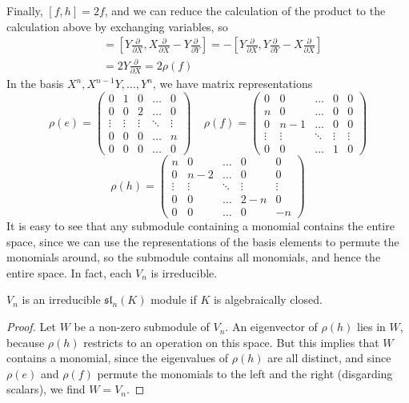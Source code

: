 %
Finally, $[f, h] = 2f$, and we can reduce the calculation of the product to the calculation above by exchanging variables, so
%
\begin{align*}
    [\rho(f), \rho(h)] &= \left[ Y \frac{\partial}{\partial X}, X \frac{\partial}{\partial X} - Y \frac{\partial}{\partial Y} \right] = - \left[ Y \frac{\partial}{\partial X}, Y \frac{\partial}{\partial Y} - X \frac{\partial}{\partial X} \right]\\
    &= 2 Y \frac{\partial}{\partial X} = 2 \rho(f)
\end{align*}
%
In the basis $X^n,X^{n-1}Y, \dots, Y^n$, we have matrix representations
%
\[ \rho(e) = \begin{pmatrix} 0 & 1 & 0 & \dots & 0 \\ 0 & 0 & 2 & \dots & 0 \\ \vdots & \vdots & \vdots & \ddots & \vdots \\ 0 & 0 & 0 & \dots & n \\ 0 & 0 & 0 & \dots & 0 \end{pmatrix}\ \ \ \ \ \rho(f) = \begin{pmatrix} 0 & 0 & \dots & 0 & 0 \\ n & 0 & \dots & 0 & 0 \\ 0 & n-1 & \dots & 0 & 0 \\ \vdots & \vdots & \ddots & \vdots & \vdots \\ 0 & 0 & \dots & 1 & 0 \end{pmatrix} \]
\[ \rho(h) = \begin{pmatrix} n & 0 & \dots & 0 & 0 \\ 0 & n-2 & \dots & 0 & 0 \\ \vdots & \vdots & \ddots & \vdots & \vdots \\ 0 & 0 & \dots & 2 - n & 0 \\ 0 & 0 & \dots & 0 & -n \end{pmatrix} \]
%
It is easy to see that any submodule containing a monomial contains the entire space, since we can use the representations of the basis elements to permute the monomials around, so the submodule contains all monomials, and hence the entire space. In fact, each $V_n$ is irreducible.

\begin{theorem}
    $V_n$ is an irreducible $\mathfrak{sl}_n(K)$ module if $K$ is algebraically closed.
\end{theorem}
\begin{proof}
    Let $W$ be a non-zero submodule of $V_n$. An eigenvector of $\rho(h)$ lies in $W$, because $\rho(h)$ restricts to an operation on this space. But this implies that $W$ contains a monomial, since the eigenvalues of $\rho(h)$ are all distinct, and since $\rho(e)$ and $\rho(f)$ permute the monomials to the left and the right (disgarding scalars), we find $W = V_n$.
\end{proof}

